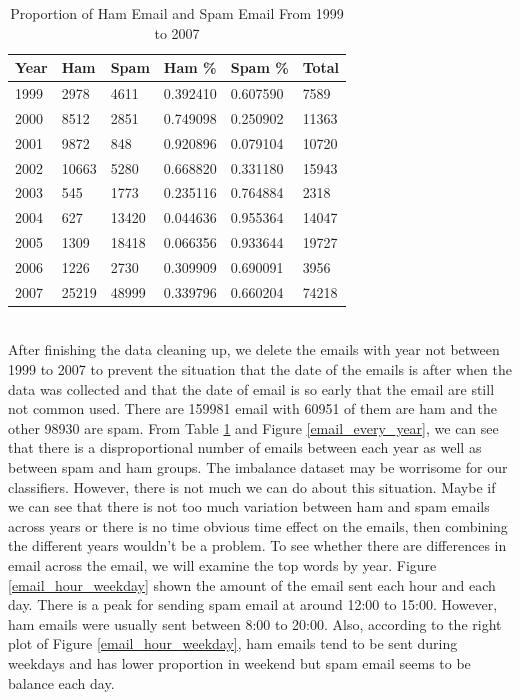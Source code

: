 \begin{table}[h]
\centering
\caption{Proportion of Ham Email and Spam Email From 1999 to 2007}
\label{proportion_ham_spam}
\begin{tabular}{@{}llllll@{}}
\toprule
Year & Ham   & Spam  & Ham \%   & Spam \%  & Total \\ \midrule
1999 & 2978  & 4611  & 0.392410 & 0.607590 & 7589  \\
2000 & 8512  & 2851  & 0.749098 & 0.250902 & 11363 \\
2001 & 9872  & 848   & 0.920896 & 0.079104 & 10720 \\
2002 & 10663 & 5280  & 0.668820 & 0.331180 & 15943 \\
2003 & 545   & 1773  & 0.235116 & 0.764884 & 2318  \\
2004 & 627   & 13420 & 0.044636 & 0.955364 & 14047 \\
2005 & 1309  & 18418 & 0.066356 & 0.933644 & 19727 \\
2006 & 1226  & 2730  & 0.309909 & 0.690091 & 3956  \\
2007 & 25219 & 48999 & 0.339796 & 0.660204 & 74218 \\ \bottomrule
\end{tabular}
\end{table}\\

After finishing the data cleaning up, we delete the emails with year not between 1999 to 2007 to prevent the situation that the date of the emails is after when the data was collected and that the date of email is so early that the email are still not common used. There are 159981 email with 60951 of them are ham and the other 98930 are spam. From Table \ref{proportion_ham_spam} and Figure \ref{email_every_year}, we can see that there is a disproportional number of emails between each year as well as between spam and ham groups. The imbalance dataset may be worrisome for our classifiers. However, there is not much we can do about this situation. Maybe if we can see that there is not too much variation between ham and spam emails across years or there is no time obvious time effect on the emails, then combining the different years wouldn't be a problem. To see whether there are differences in email across the email, we will examine the top words by year. Figure \ref{email_hour_weekday} shown the amount of the email sent each hour and each day. There is a peak for sending spam email at around 12:00 to 15:00. However, ham emails were usually sent between 8:00 to 20:00. Also, according to the right plot of Figure \ref{email_hour_weekday}, ham emails tend to be sent during weekdays and has lower proportion in weekend but spam email seems to be balance each day.\\



